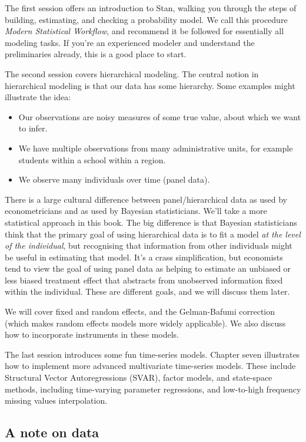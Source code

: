 \documentclass[]{book}
\providecommand{\tightlist}{%
  \setlength{\itemsep}{0pt}\setlength{\parskip}{0pt}}
\begin{document}
The first session offers an introduction to Stan, walking you through
the steps of building, estimating, and checking a probability model. We
call this procedure \emph{Modern Statistical Workflow}, and recommend it
be followed for essentially all modeling tasks. If you're an experienced
modeler and understand the preliminaries already, this is a good place
to start.

The second session covers hierarchical modeling. The central notion in
hierarchical modeling is that our data has some hierarchy. Some examples
might illustrate the idea:

\begin{itemize}
\tightlist
\item
  Our observations are noisy measures of some true value, about which we
  want to infer.
\item
  We have multiple observations from many administrative units, for
  example students within a school within a region.
\item
  We observe many individuals over time (panel data).
\end{itemize}

There is a large cultural difference between panel/hierarchical data as
used by econometricians and as used by Bayesian statisticians. We'll
take a more statistical approach in this book. The big difference is
that Bayesian statisticians think that the primary goal of using
hierarchical data is to fit a model \emph{at the level of the
individual}, but recognising that information from other individuals
might be useful in estimating that model. It's a crass simplification,
but economists tend to view the goal of using panel data as helping to
estimate an unbiased or less biased treatment effect that abstracts from
unobserved information fixed within the individual. These are different
goals, and we will discuss them later.

We will cover fixed and random effects, and the Gelman-Bafumi correction
(which makes random effects models more widely applicable). We also
discuss how to incorporate instruments in these models.

The last session introduces some fun time-series models. Chapter seven
illustrates how to implement more advanced multivariate time-series
models. These include Structural Vector Autoregressions (SVAR), factor
models, and state-space methods, including time-varying parameter
regressions, and low-to-high frequency missing values interpolation.

\subsection{A note on data}\label{a-note-on-data}
\end{document}
